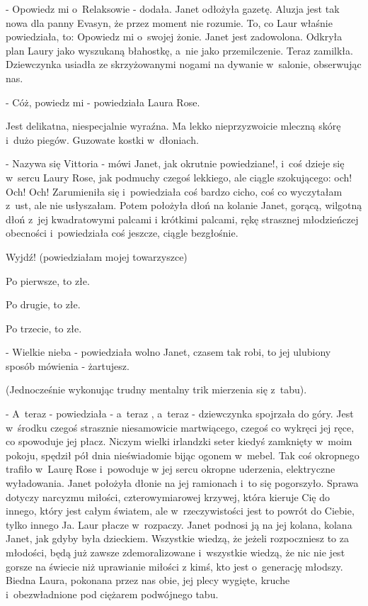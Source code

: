 \documentclass[oneside,polish,12pt,sfheadings]{mwbk}
\begin{document}
- Opowiedz mi o~Relaksowie - dodała. Janet odłożyła gazetę. Aluzja
jest tak nowa dla panny Evasyn, że przez moment nie rozumie. To, co
Laur właśnie powiedziała, to: Opowiedz mi o~swojej żonie. Janet jest
zadowolona. Odkryła plan Laury jako wyszukaną błahostkę, a~nie jako
przemilczenie. Teraz zamilkła. Dziewczynka usiadła ze skrzyżowanymi
nogami na dywanie w~salonie, obserwując nas.

- Cóż, powiedz mi - powiedziała Laura Rose.

Jest delikatna, niespecjalnie wyraźna. Ma lekko nieprzyzwoicie mleczną
skórę i~dużo piegów. Guzowate kostki w~dłoniach.

- Nazywa się Vittoria - mówi Janet, jak okrutnie powiedziane!, i~coś
dzieje się w~sercu Laury Rose, jak podmuchy czegoś lekkiego, ale ciągle
szokującego: och! Och! Och! Zarumieniła się i~powiedziała coś bardzo
cicho, coś co wyczytałam z~ust, ale nie usłyszałam. Potem położyła
dłoń na kolanie Janet, gorącą, wilgotną dłoń z~jej kwadratowymi palcami
i krótkimi palcami, rękę strasznej młodzieńczej obecności i~powiedziała
coś jeszcze, ciągle bezgłośnie.

Wyjdź! (powiedziałam mojej towarzyszce)

Po pierwsze, to złe.

Po drugie, to złe.

Po trzecie, to złe.

- Wielkie nieba - powiedziała wolno Janet, czasem tak robi, to jej
ulubiony sposób mówienia - żartujesz.

(Jednocześnie wykonując trudny mentalny trik mierzenia się z~tabu).

- A~teraz - powiedziała - a~teraz , a~teraz - dziewczynka spojrzała
do góry. Jest w~środku czegoś strasznie niesamowicie martwiącego,
czegoś co wykręci jej ręce, co spowoduje jej płacz. Niczym wielki
irlandzki seter kiedyś zamknięty w~moim pokoju, spędził pół dnia nieświadomie
bijąc ogonem w~mebel. Tak coś okropnego trafiło w~Laurę Rose i~powoduje
w jej sercu okropne uderzenia, elektryczne wyładowania. Janet położyła
dłonie na jej ramionach i~to się pogorszyło. Sprawa dotyczy narcyzmu
miłości, czterowymiarowej krzywej, która kieruje Cię do innego, który
jest całym światem, ale w~rzeczywistości jest to powrót do Ciebie,
tylko innego Ja. Laur płacze w~rozpaczy. Janet podnosi ją na jej kolana,
kolana Janet, jak gdyby była dzieckiem. Wszystkie wiedzą, że jeżeli
rozpoczniesz to za młodości, będą już zawsze zdemoralizowane i~wszystkie
wiedzą, że nic nie jest gorsze na świecie niż uprawianie miłości z
kimś, kto jest o~generację młodszy. Biedna Laura, pokonana przez nas
obie, jej plecy wygięte, kruche i~obezwładnione pod ciężarem podwójnego
tabu.
\end{document}
